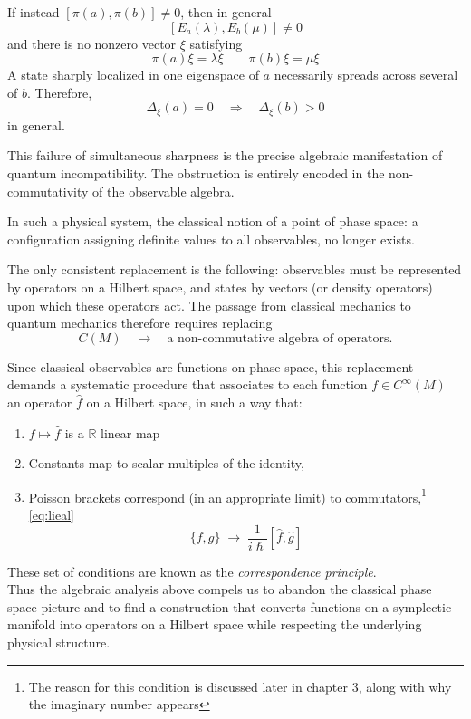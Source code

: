 \documentclass[
  12pt,
  a4paper, oneside
]{report}
\theoremstyle{bolddef}
\theoremstyle{remark}
\numberwithin{equation}{chapter}
\begin{document}
If instead $[\pi(a),\pi(b)]\neq 0$, then in general
$$
[E_a(\lambda),E_b(\mu)]\neq 0
$$
and there is no nonzero vector $\xi$ satisfying
$$
\pi(a)\xi=\lambda\xi
\qquad
\pi(b)\xi=\mu\xi
$$
A state sharply localized in one eigenspace of $a$
necessarily spreads across several of $b$.
Therefore,
$$
\Delta_\xi(a)=0
\quad\Rightarrow\quad
\Delta_\xi(b)>0
$$
in general. 

This failure of simultaneous sharpness is the precise algebraic
manifestation of quantum incompatibility. The obstruction is entirely
encoded in the non-commutativity of the observable algebra.

\medskip

In such a physical system, the classical notion of a point of phase space: a configuration
assigning definite values to all observables, no longer exists.

The only consistent replacement is the following:
observables must be represented by operators on a Hilbert space,
and states by vectors (or density operators) upon which these operators act.
The passage from classical mechanics to quantum mechanics therefore
requires replacing
$$
C(M)
\quad\longrightarrow\quad
\text{a non-commutative algebra of operators}.
$$

Since classical observables are functions on phase space,
this replacement demands a systematic procedure that associates to each
function $f\in C^\infty(M)$ an operator $\hat f$ on a Hilbert space,
in such a way that:
\begin{enumerate}[label=\textnormal{(\arabic*)}]
  \item $f \mapsto \hat{f}$ is a $\mathbb{R}$ linear map
\item Constants map to scalar multiples of the identity,
\item Poisson brackets correspond (in an appropriate limit)
to commutators,\footnote{The reason for this condition is discussed later in chapter 3, along with why the imaginary number appears}
\eqref{eq:lieal} 
$$
\{f,g\}
\;\longrightarrow\;
\frac{1}{i\hslash} [\hat f,\hat{g}]
$$
\end{enumerate}
These set of conditions are known as the \textit{correspondence principle}. \\ Thus the algebraic analysis above compels us to abandon the classical
phase space picture and to find a construction that converts functions
on a symplectic manifold into operators on a Hilbert space while
respecting the underlying physical structure.
\end{document}
